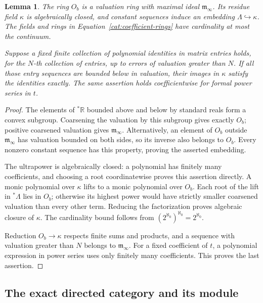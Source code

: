 \documentclass[11pt]{article}
\newtheorem{lemma}[theorem]{Lemma}
\theoremstyle{definition}
\theoremstyle{remark}
\newcommand{\R}{\mathbb R}
\numberwithin{equation}{section}
\begin{document}
\begin{lemma}\label{cat:residue}
The ring \(O_b\) is a valuation ring with maximal ideal
\(\mathfrak m_\infty\).  Its residue field \(\kappa\) is algebraically
closed, and constant sequences induce an embedding
\(\Lambda\hookrightarrow\kappa\).  The fields and rings in
Equation~\eqref{cat:coefficient-rings} have cardinality at most the
continuum.

Suppose a fixed finite collection of polynomial identities in matrix
entries holds, for the \(N\)-th collection of entries, up to errors of
valuation greater than \(N\).  If all those entry sequences are bounded
below in valuation, their images in \(\kappa\) satisfy the identities
exactly.  The same assertion holds coefficientwise for formal power
series in \(t\).
\end{lemma}

\begin{proof}
The elements of \({}^*\R\) bounded above and below by standard reals form
a convex subgroup.  Coarsening the valuation by this subgroup gives
exactly \(O_b\); positive coarsened valuation gives
\(\mathfrak m_\infty\).  Alternatively, an element of \(O_b\) outside
\(\mathfrak m_\infty\) has valuation bounded on both sides, so its inverse
also belongs to \(O_b\).  Every nonzero constant sequence has this
property, proving the asserted embedding.

The ultrapower is algebraically closed: a polynomial has finitely many
coefficients, and choosing a root coordinatewise proves this assertion
directly.  A monic polynomial over \(\kappa\) lifts to a monic polynomial
over \(O_b\).  Each root of the lift in \({}^*\Lambda\) lies in \(O_b\);
otherwise its highest power would have strictly smaller coarsened
valuation than every other term.  Reducing the factorization proves
algebraic closure of \(\kappa\).  The cardinality bound follows from
\((2^{\aleph_0})^{\aleph_0}=2^{\aleph_0}\).

Reduction \(O_b\to\kappa\) respects finite sums and products, and a sequence
with valuation greater than \(N\) belongs to \(\mathfrak m_\infty\).
For a fixed coefficient of \(t\), a polynomial expression in power
series uses only finitely many coefficients.  This proves the last
assertion.
\end{proof}

\subsection{The exact directed category and its module}
\end{document}
